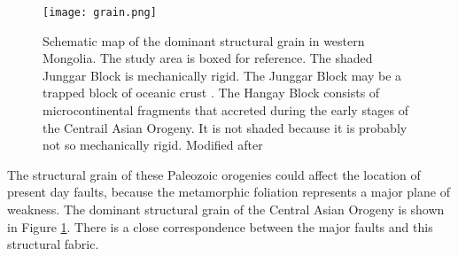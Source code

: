 \begin{figure}[h!]
  \centering
  \texttt{[image: grain.png]}
  \caption{Schematic map of the dominant structural grain in western Mongolia. The study area is boxed for reference. The shaded Junggar Block is mechanically rigid. The Junggar Block may be a trapped block of oceanic crust \citep{Carroll1990a}.  The Hangay Block consists of microcontinental fragments that accreted during the early stages of the Centrail Asian Orogeny. It is not shaded because it is probably not so mechanically rigid.  Modified after \citet{Cunningham2005a}}
  \label{grain}
\end{figure}

The structural grain of these Paleozoic orogenies could affect the location of present day faults, because the metamorphic foliation represents a major plane of weakness. The dominant structural grain of the Central Asian Orogeny is shown in Figure \ref{grain}. There is a close correspondence between the major faults and this structural fabric. 

\clearpage

